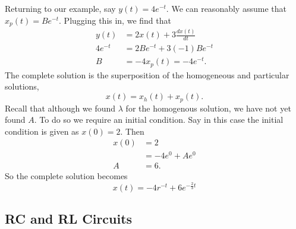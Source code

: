 \documentclass[nobib]{tufte-handout}
\begin{document}
Returning to our example, say 
$y(t) = 4e^{-t}$. We can reasonably 
assume that $x_p(t) = Be^{-t}$. 
Plugging this in, we find that 
\begin{align}
    y(t) &= 2x(t) + 3 \frac{dx(t)}{dt} \\
    4e^{-t} &= 2Be^{-t} + 3(-1)Be^{-t} \\
    B &= -4
    x_p(t) = -4e^{-t}.
\end{align}
The complete solution is the superposition 
of the homogeneous and particular solutions, 
\begin{equation}
    x(t) = x_h(t) + x_p(t).
\end{equation}
Recall that although we found $\lambda$ 
for the homogenous solution, we have not 
yet found $A$. To do so we require 
an initial condition. Say in this case 
the initial condition is given as 
$x(0) = 2$. Then 
\begin{align}
    x(0) &= 2 \\
    &= -4e^0 + Ae^0 \\
    A &= 6.
\end{align}
So the complete solution becomes 
\begin{equation}
    x(t) = -4r^{-t} + 6e^{-\frac{2}{3}t}
\end{equation}

\subsection{RC and RL Circuits}
\end{document}
